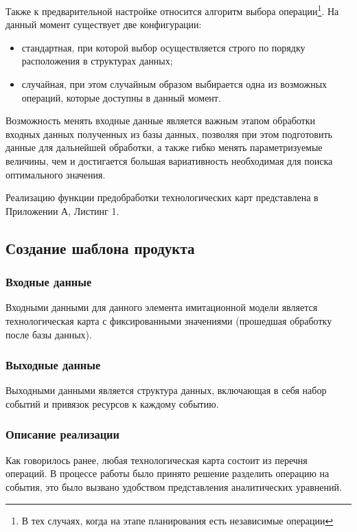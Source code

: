 Также к предварительной настройке относится алгоритм выбора операции\footnote{В тех случаях, когда на этапе планирования есть независимые операции}. На данный момент существует две конфигурации:

\begin{itemize}
    \item[1)] стандартная, при которой выбор осуществляется строго по порядку расположения в структурах данных;
    \item[2)] случайная, при этом случайным образом выбирается одна из возможных операций, которые доступны в данный момент. 
\end{itemize}

Возможность менять входные данные является важным этапом обработки входных данных полученных из базы данных, позволяя при этом подготовить данные для дальнейшей обработки, а также гибко менять параметризуемые величины, чем и достигается большая вариативность необходимая для поиска оптимального значения.

Реализацию функции предобработки технологических карт представлена в Приложении А, Листинг 1.

\subsection{Создание шаблона продукта}

\subsubsection*{Входные данные}
Входными данными для данного элемента имитационной модели является технологическая карта с фиксированными значениями (прошедшая обработку после базы данных).

\subsubsection*{Выходные данные}
\label{imcore:mkProductTemplate_output_data}
Выходными данными является структура данных, включающая в себя набор событий и привязок ресурсов к каждому событию.

\subsubsection*{Описание реализации}
Как говорилось ранее, любая технологическая карта состоит из перечня операций. В процессе работы было принято решение разделить операцию на события, это было вызвано удобством представления аналитических уравнений.

